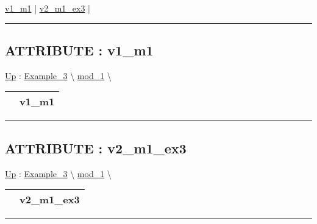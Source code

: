 \par


\hyperlink{ecldoc:intest.inintest.example_3.mod_1.v1_m1}{v1\_m1}  |
\hyperlink{ecldoc:intest.inintest.example_3.mod_1.v2_m1_ex3}{v2\_m1\_ex3}  |

\rule{\linewidth}{0.5pt}

\subsection*{ATTRIBUTE : v1\_m1}
\hypertarget{ecldoc:intest.inintest.example_3.mod_1.v1_m1}{}
\hyperlink{ecldoc:intest.inintest.Example_3.mod_1}{Up} :
\hspace{0pt} \hyperlink{ecldoc:intest.inintest.Example_3}{Example_3} \textbackslash 
\hspace{0pt} \hyperlink{ecldoc:intest.inintest.Example_3.mod_1}{mod_1} \textbackslash 

{\renewcommand{\arraystretch}{1.5}
\begin{tabularx}{\textwidth}{|>{\raggedright\arraybackslash}l|X|}
\hline
\hspace{0pt} & v1\_m1 \\
\hline
\end{tabularx}
}

\par


\rule{\linewidth}{0.5pt}
\subsection*{ATTRIBUTE : v2\_m1\_ex3}
\hypertarget{ecldoc:intest.inintest.example_3.mod_1.v2_m1_ex3}{}
\hyperlink{ecldoc:intest.inintest.Example_3.mod_1}{Up} :
\hspace{0pt} \hyperlink{ecldoc:intest.inintest.Example_3}{Example_3} \textbackslash 
\hspace{0pt} \hyperlink{ecldoc:intest.inintest.Example_3.mod_1}{mod_1} \textbackslash 

{\renewcommand{\arraystretch}{1.5}
\begin{tabularx}{\textwidth}{|>{\raggedright\arraybackslash}l|X|}
\hline
\hspace{0pt} & v2\_m1\_ex3 \\
\hline
\end{tabularx}
}

\par


\rule{\linewidth}{0.5pt}




